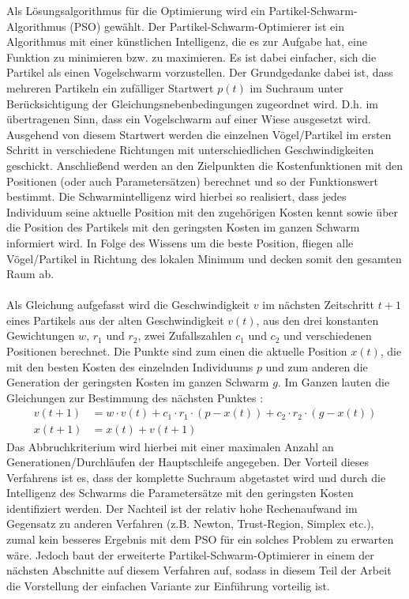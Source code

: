 Als Lösungsalgorithmus für die Optimierung wird ein Partikel-Schwarm-Algorithmus (PSO) gewählt. Der Partikel-Schwarm-Optimierer ist ein Algorithmus mit einer künstlichen Intelligenz, die es zur Aufgabe hat, eine Funktion zu minimieren bzw. zu maximieren. Es ist dabei einfacher, sich die Partikel als einen Vogelschwarm vorzustellen. Der Grundgedanke dabei ist, dass mehreren Partikeln ein zufälliger Startwert $p\left( t \right)$ im Suchraum unter Berücksichtigung der Gleichungsnebenbedingungen zugeordnet wird. D.h. im übertragenen Sinn, dass ein Vogelschwarm auf einer Wiese ausgesetzt wird. Ausgehend von diesem Startwert werden die einzelnen Vögel/Partikel im ersten Schritt in verschiedene Richtungen mit unterschiedlichen Geschwindigkeiten geschickt. Anschließend werden an den Zielpunkten die Kostenfunktionen mit den Positionen (oder auch Parametersätzen) berechnet und so der Funktionswert bestimmt. Die Schwarmintelligenz wird hierbei so realisiert, dass jedes Individuum seine aktuelle Position mit den zugehörigen Kosten kennt sowie über die Position des Partikels mit den geringsten Kosten im ganzen Schwarm informiert wird. In Folge des Wissens um die beste Position, fliegen alle Vögel/Partikel in Richtung des lokalen Minimum und decken somit den gesamten Raum ab. \\ \\
Als Gleichung aufgefasst wird die Geschwindigkeit $v$ im nächsten Zeitschritt $t+1$ eines Partikels aus der alten Geschwindigkeit $v\left( t \right)$, aus den drei konstanten Gewichtungen $w$, $r_1$ und $r_2$, zwei Zufallszahlen $c_1$ und $c_2$ und verschiedenen Positionen berechnet. Die Punkte sind zum einen die aktuelle Position $x\left( t \right)$, die mit den besten Kosten des einzelnden Individuums $p$ und zum anderen die Generation der geringsten Kosten im ganzen Schwarm $g$. Im Ganzen lauten die Gleichungen zur Bestimmung des nächsten Punktes \cite{PSO}:
\begin{align}
v\left( t+1 \right)&=w\cdot v\left( t \right) + c_1\cdot r_1\cdot \left( p - x\left( t \right) \right)+c_2\cdot r_2\cdot \left( g - x\left( t \right) \right) \\
x\left( t+1 \right)&=x\left( t \right) + v\left( t+1 \right)
\end{align}
Das Abbruchkriterium wird hierbei mit einer maximalen Anzahl an Generationen/Durchläufen der Hauptschleife angegeben. Der Vorteil dieses Verfahrens ist es, dass der komplette Suchraum abgetastet wird und durch die Intelligenz des Schwarms die Parametersätze mit den geringsten Kosten identifiziert werden. Der Nachteil ist der relativ hohe Rechenaufwand im Gegensatz zu anderen Verfahren (z.B. Newton, Trust-Region, Simplex etc.), zumal kein besseres Ergebnis mit dem PSO für ein solches Problem zu erwarten wäre. Jedoch baut der erweiterte Partikel-Schwarm-Optimierer in einem der nächsten Abschnitte auf diesem Verfahren auf, sodass in diesem Teil der Arbeit die Vorstellung der einfachen Variante zur Einführung vorteilig ist.\\ \\
